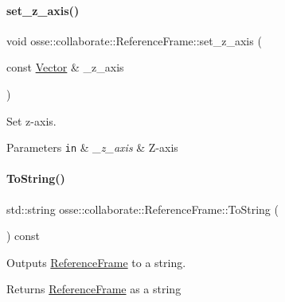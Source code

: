 \paragraph{\texorpdfstring{set\+\_\+z\+\_\+axis()}{set\_z\_axis()}}
{\footnotesize\ttfamily void osse\+::collaborate\+::\+Reference\+Frame\+::set\+\_\+z\+\_\+axis (\begin{DoxyParamCaption}\item[{const \hyperlink{classosse_1_1collaborate_1_1_vector}{Vector} \&}]{\+\_\+z\+\_\+axis }\end{DoxyParamCaption})\hspace{0.3cm}{\ttfamily [inline]}}



Set z-\/axis. 


\begin{DoxyParams}[1]{Parameters}
\mbox{\tt in}  & {\em \+\_\+z\+\_\+axis} & Z-\/axis \\
\hline
\end{DoxyParams}
\mbox{\label{classosse_1_1collaborate_1_1_reference_frame_ae5b5e9f9dcb5841fbeb910402afc3b77}} 
\paragraph{\texorpdfstring{To\+String()}{ToString()}}
{\footnotesize\ttfamily std\+::string osse\+::collaborate\+::\+Reference\+Frame\+::\+To\+String (\begin{DoxyParamCaption}{ }\end{DoxyParamCaption}) const}



Outputs \hyperlink{classosse_1_1collaborate_1_1_reference_frame}{Reference\+Frame} to a string. 

\begin{DoxyReturn}{Returns}
\hyperlink{classosse_1_1collaborate_1_1_reference_frame}{Reference\+Frame} as a string 
\end{DoxyReturn}
\mbox{\label{classosse_1_1collaborate_1_1_reference_frame_a560f99ed2e6d7298cffbfbab84fe4a94}} 
